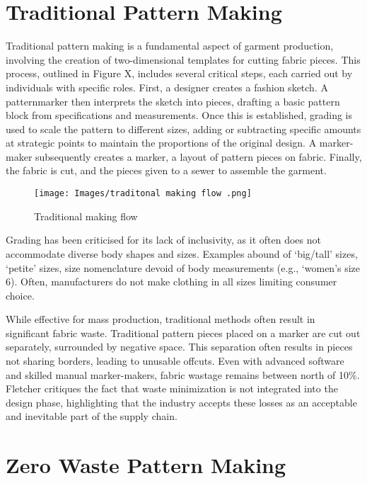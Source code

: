 \section{Traditional Pattern Making}
Traditional pattern making is a fundamental aspect of garment production, involving the creation of two-dimensional templates for cutting fabric pieces. This process, outlined in Figure X, includes several critical steps, each carried out by individuals with specific roles. First, a designer creates a fashion sketch. A patternmarker then interprets the sketch into pieces, drafting a basic pattern block from specifications and measurements. Once this is established, grading is used to scale the pattern to different sizes, adding or subtracting specific amounts at strategic points to maintain the proportions of the original design. A marker-maker subsequently creates a marker, a layout of pattern pieces on fabric. Finally, the fabric is cut, and the pieces given to a sewer to assemble the garment.
\begin{figure} [H]
    \centering
    \texttt{[image: Images/traditonal making flow .png]}
    \caption{Traditional making flow}
\end{figure}
Grading has been criticised for its lack of inclusivity, as it often does not accommodate diverse body shapes and sizes. Examples abound of ‘big/tall’ sizes, ‘petite’ sizes, size nomenclature devoid of body measurements (e.g., ‘women’s size 6). Often, manufacturers do not make clothing in all sizes limiting consumer choice.

While effective for mass production, traditional methods often result in significant fabric waste. Traditional pattern pieces placed on a marker are cut out separately, surrounded by negative space. This separation often results in pieces not sharing borders, leading to unusable offcuts.  Even with advanced software and skilled manual marker-makers, fabric wastage remains between north of 10\%. Fletcher critiques the fact that waste minimization is not integrated into the design phase, highlighting that the industry accepts these losses as an acceptable and inevitable part of the supply chain.

\section{Zero Waste Pattern Making}
